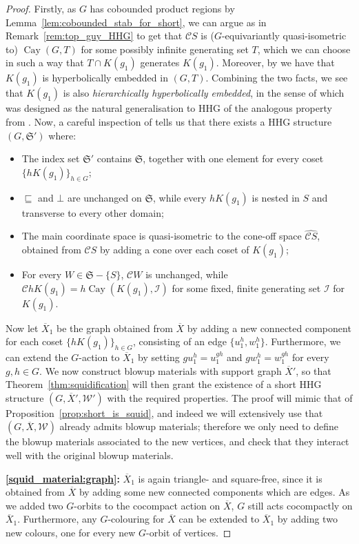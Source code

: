 \documentclass[svgnames]{amsart}
\theoremstyle{plain}
\theoremstyle{definition}
\newcommand{\Cay}[2]{\operatorname{Cay}\left(#1,#2\right)}
\newcommand{\frakS}{\mathfrak S}
\newcommand{\C}{\mathcal C}
\newcommand{\ov}[1]{\overline{#1}}
\newcommand{\nest}{\sqsubseteq}
\newcommand{\orth}{\bot}
\newcommand{\W}{\mathcal{W}}
\newcommand{\h}{\widehat}
\begin{document}
\begin{proof}
Firstly, as $G$ has cobounded product regions by Lemma~\ref{lem:cobounded_stab_for_short}, we can argue as in  Remark~\ref{rem:top_guy_HHG} to get that $\C S$ is ($G$-equivariantly quasi-isometric to) $\Cay{G}{T}$ for some possibly infinite generating set $T$, which we can choose in such a way that $T\cap K(g_1)$ generates $K(g_1)$. Moreover, by \cite[Theorem 6.8]{DGO} we have that $K(g_1)$ is hyperbolically embedded in $(G,T)$.  Combining the two facts, we see that $K(g_1)$ is also \emph{hierarchically hyperbolically embedded}, in the sense of \cite[Definition 6.2]{hhs_asdim} which was designed as the natural generalisation to HHG of the analogous property from \cite{DGO}. Now, a careful inspection of \cite[Proposition 6.14]{hhs_asdim} tells us that there exists a HHG structure $(G,\frakS')$ where:
\begin{itemize}
        \item The index set $\frakS'$ contains $\frakS$, together with one element for every coset $\{hK(g_1)\}_{h\in G}$;
        \item $\nest$ and $\orth$ are unchanged on $\frakS$, while every $hK(g_1)$ is nested in $S$ and transverse to every other domain;
        \item The main coordinate space is quasi-isometric to the cone-off space $\h{\C S}$, obtained from $\C S$ by adding a cone over each coset of $K(g_1)$;
        \item For every $W\in \frakS-\{S\}$, $\C W$ is unchanged, while $\C hK(g_1)=h\Cay{K(g_1)}{\mathcal I}$ for some fixed, finite generating set $\mathcal I$ for $K(g_1)$.
\end{itemize}
Now let $\ov X_1$ be the graph obtained from $\ov{X}$ by adding a new connected component for each coset $\{hK(g_1)\}_{h\in G}$, consisting of an edge $\{u^h_1, w^h_1\}$. Furthermore, we can extend the $G$-action to $\ov{X}_1$ by setting $gu^h_1=u^{gh}_1$ and $gw^h_1=w^{gh}_1$ for every $g,h\in G$. We now construct blowup materials with support graph $\ov X'$, so that Theorem~\ref{thm:squidification} will then grant the existence of a short HHG structure $(G, \ov X',\W')$ with the required properties. The proof will mimic that of Proposition~\ref{prop:short_is_squid}, and indeed we will extensively use that $(G, \ov X, \W)$ already admits blowup materials; therefore we only need to define the blowup materials associated to the new vertices, and check that they interact well with the original blowup materials.

\par\medskip
\textbf{\eqref{squid_material:graph}:} $\ov X_1$ is again triangle- and square-free, since it is obtained from $\ov X$ by adding some new connected components which are edges. As we added two $G$-orbits to the cocompact action on $\ov X$, $G$ still acts cocompactly on $\ov X_1$. Furthermore, any $G$-colouring for $\ov X$ can be extended to $\ov X_1$ by adding two new colours, one for every new $G$-orbit of vertices.
\par\medskip


\end{proof}
\end{document}
